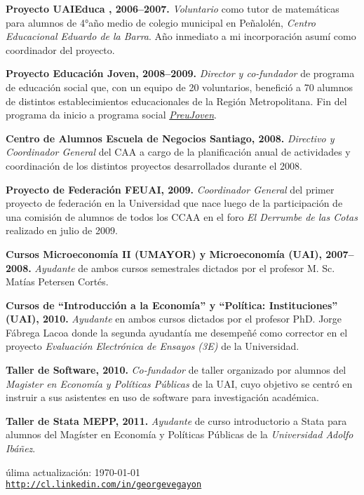 \documentclass[letterpaper, 12pt]{article}
\def\footerlink{http://cl.linkedin.com/in/georgevegayon}
\renewenvironment{itemize}{
  \begin{list}{}{
    \setlength{\leftmargin}{0.45cm}
  }
}{
  \end{list}
}
\begin{document}
\begin{itemize}
\item \textbf{Proyecto UAIEduca , 2006--2007.} \emph{Voluntario} como tutor de matemáticas para alumnos de 4°año medio de colegio municipal en Peñalolén, \emph{Centro Educacional Eduardo de la Barra}. Año inmediato a mi incorporación asumí como coordinador del proyecto.
\item \textbf{Proyecto Educación Joven, 2008--2009.} \emph{Director y co-fundador} de programa de educación social que, con un equipo de 20 voluntarios, benefició a 70 alumnos de distintos establecimientos educacionales de la Región Metropolitana. Fin del programa da inicio a programa social \href{http://www.preujoven.cl}{\emph {PreuJoven}}.
\item \textbf{Centro de Alumnos Escuela de Negocios Santiago, 2008.} \emph{Directivo y Coordinador General} del CAA a cargo de la planificación anual de actividades y coordinación de los distintos proyectos desarrollados durante el 2008.
\item \textbf{Proyecto de Federación FEUAI, 2009.} \emph{Coordinador General} del primer proyecto de federación en la Universidad que nace luego de la participación de una comisión de alumnos de todos los CCAA en el foro \emph{El Derrumbe de las Cotas} realizado en julio de 2009.
\item \textbf{Cursos Microeconomía II (UMAYOR) y Microeconomía (UAI), 2007--2008.} \emph{Ayudante} de ambos cursos semestrales dictados por el profesor M. Sc. Matías Petersen Cortés.
\item \textbf{Cursos de ``Introducción a la Economía'' y ``Política: Instituciones'' (UAI), 2010.} \emph{Ayudante} en ambos cursos dictados por el profesor PhD. Jorge Fábrega Lacoa donde la segunda ayudantía me desempeñé como corrector en el proyecto \emph{Evaluación Electrónica de Ensayos (3E)} de la Universidad.
\item \textbf{Taller de Software, 2010.} \emph{Co-fundador} de taller organizado por alumnos del \emph{Magister en Economía y Políticas Públicas} de la UAI, cuyo objetivo se centró en instruir a sus asistentes en uso de software para investigación académica.
\item \textbf{Taller de Stata MEPP, 2011.} \emph{Ayudante} de curso introductorio a Stata para alumnos del Magíster en Economía y Políticas Públicas de la \emph{Universidad Adolfo Ibáñez}.
\end{itemize}

\bigskip

\begin{center}
  \begin{footnotesize}
    úlima actualización: \today \\
    \href{\footerlink}{\texttt{\footerlink}}
  \end{footnotesize}
\end{center}
\end{document}
